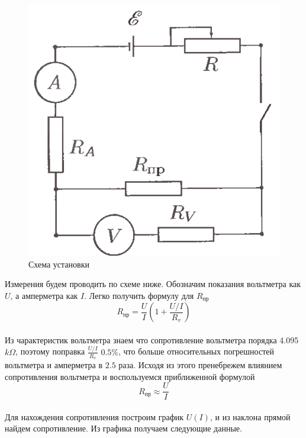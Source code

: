 \documentclass[a4paper,12pt]{article}
\begin{document}
    \begin{figure}
        \begin{center}
            \includegraphics[scale=0.3]{sxema.png}
            \caption{Схема установки}
        \end{center}
    \end{figure}
    Измерения будем проводить по схеме ниже. Обозначим показания вольтметра как $U$, а амперметра как $I$. Легко получить формулу для $R_{пр}$
    \[R_{пр} = \frac{U}{I}\left(1 + \frac{U/I}{R_{v}}\right)\]
    \paragraph{}
    Из чарактеристик вольтметра знаем что сопротивление вольтметра порядка 4.095$k\Omega$, поэтому поправка $\frac{U/I}{R_v}$  $0.5\%$, что больше относительных погрешностей вольтметра и амперметра в $2.5$ раза. Исходя из этого пренебрежем влиянием сопротивления вольтметра и воспользуемся приближенной формулой
    \[R_{пр}\approx\frac{U}{I}\]
    \newpage
    \paragraph{}
    Для нахождения сопротивления построим график $U(I)$, и из наклона прямой найдем сопротивление. Из графика получаем следующие данные.
   
\end{document}
